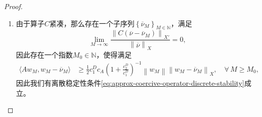 \begin{proof}
\begin{enumerate}
  \item
  由于算子$C$紧凑，那么存在一个子序列$\left\{ \overline{\nu}_{M} \right\}_{M \in \mathbb{N}}$，满足
  \begin{equation*}
    \lim_{M \rightarrow \infty}
    \frac{
    \left\|
    C \left( \overline{\nu} - \overline{\nu}_{M} \right)
    \right\|_{X'}
    }{
    \left\| \overline{\nu} \right\|_{X}
    } = 0,
  \end{equation*}
因此存在一个指数$M_{0} \in \mathbb{N}$，使得满足
\begin{equation*}
  \begin{split}
    \langle A w_{M}, w_{M} - \overline{\nu}_{M} \rangle
    & \ge \frac{1}{2} c_{1}^{D} c_{A}
    \left( 1 + \frac{c_{2}^{D}}{c_{1}^{D}} \right)^{-1}
    \left\| w_{M} \right\|
    \left\| w_{M} - \overline{\nu}_{M} \right\|_{X}, \quad \forall \, M \ge M_{0},
  \end{split}
\end{equation*}
因此我们有离散稳定性条件\eqref{eq:approx-coercive-operator-discrete-stability}成立。
\end{enumerate}
\end{proof}
